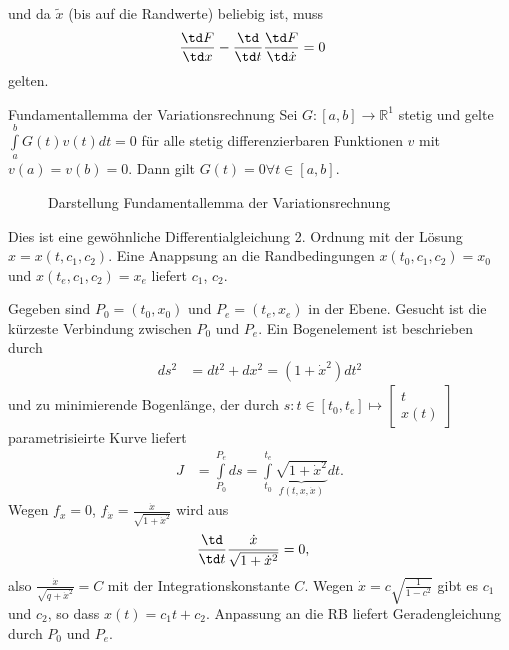 und da $\tilde{x}$ (bis auf die Randwerte) beliebig ist, muss 
\begin{align}
	\frac{\td F}{\td x}-\frac{\td}{\td t}\frac{\td F}{\td\dot{x}} & = 0 \label{eqn:kap_2_euler_lag_dgl}
\end{align}
gelten.
\begin{remark}{Fundamentallemma der Variationsrechnung}
Sei $G:\left[a,b \right]\rightarrow\mathbb{R}^1$ stetig und gelte $\int\limits_a^b G(t)v(t)dt=0$ für alle stetig differenzierbaren Funktionen $v$ mit
$v(a)=v(b)=0$. Dann gilt $G(t)=0\forall t\in\left[a,b \right]$.
\begin{figure}[htb]
	\centering
	
	\caption{Darstellung Fundamentallemma der Variationsrechnung}
	\label{fig:kap_2_fundlemma_var}
\end{figure}
\end{remark}
Dies ist eine gewöhnliche Differentialgleichung 2. Ordnung mit der Lösung $x=x(t,c_1,c_2)$. Eine Anappsung an die Randbedingungen $x(t_0,c_1,c_2)=x_0$
und $x(t_e,c_1,c_2)=x_e$ liefert $c_1$, $c_2$.
\begin{exmp}
Gegeben sind $P_0=(t_0,x_0)$ und $P_e=(t_e,x_e)$ in der Ebene. Gesucht ist die kürzeste Verbindung zwischen $P_0$ und $P_e$. Ein Bogenelement ist
beschrieben durch 
\begin{align*}
	ds^2 & = dt^2 + dx^2 = \left(1+\dot{x}^2 \right)dt^2
\end{align*}
und zu minimierende Bogenlänge, der durch $s:t\in\left[t_0,t_e \right]\mapsto \begin{bmatrix}
t\\ x(t)
\end{bmatrix}$ parametrisieirte Kurve liefert
\begin{align*}
	J  & = \int\limits_{P_0}^{P_e}ds=\int\limits_{t_0}^{t_e}\underbrace{\sqrt{1+\dot{x}^2}}_{f(t,x,\dot{x})}dt.
\end{align*}
Wegen $f_x=0$, $f_{\dot{x}}=\frac{\dot{x}}{\sqrt{1+\dot{x}^2}}$ wird aus  
\begin{align*}
	\frac{\td}{\td t}\frac{\dot{x}}{\sqrt{1+\dot{x}^2}} & = 0,
\end{align*}
also $\frac{\dot{x}}{\sqrt{q+\dot{x}^2}}=C$ mit der Integrationskonstante $C$. Wegen $\dot{x}=c\sqrt{\frac{1}{1-c^2}}$ gibt es $c_1$ und $c_2$, so
dass $x(t)=c_1 t+c_2$. Anpassung an die \ac{RB} liefert Geradengleichung durch $P_0$ und $P_e$.
\end{exmp}
